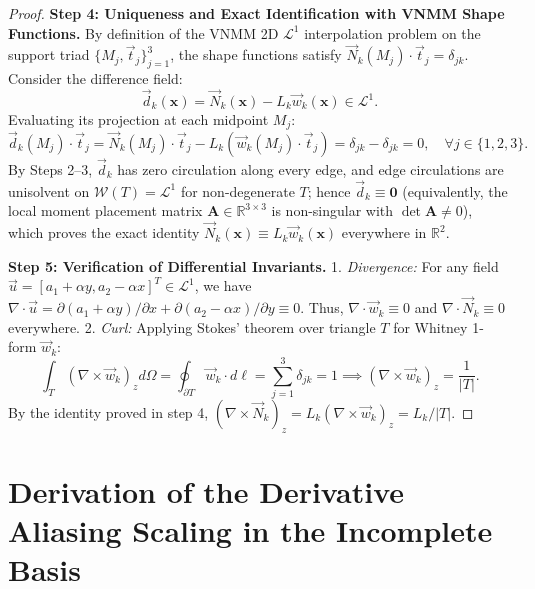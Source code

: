 \documentclass[preprint,12pt]{elsarticle}
\begin{document}
\begin{proof}
    \textbf{Step 4: Uniqueness and Exact Identification with VNMM Shape Functions.}
    By definition of the VNMM 2D $\mathcal{L}^1$ interpolation problem on the support triad $\{M_j, \vec{t}_j\}_{j=1}^3$, the shape functions satisfy $\vec{N}_k(M_j) \cdot \vec{t}_j = \delta_{jk}$. Consider the difference field:
    \begin{equation}
        \vec{d}_k(\mathbf{x}) = \vec{N}_k(\mathbf{x}) - L_k \vec{w}_k(\mathbf{x}) \in \mathcal{L}^1.
    \end{equation}
    Evaluating its projection at each midpoint $M_j$:
    \begin{equation}
        \vec{d}_k(M_j) \cdot \vec{t}_j = \vec{N}_k(M_j) \cdot \vec{t}_j - L_k \left( \vec{w}_k(M_j) \cdot \vec{t}_j \right) = \delta_{jk} - \delta_{jk} = 0, \quad \forall j \in \{1, 2, 3\}.
    \end{equation}
    By Steps 2--3, $\vec{d}_k$ has zero circulation along every edge, and edge circulations are unisolvent on $\mathcal{W}(T)=\mathcal{L}^1$ for non-degenerate $T$; hence $\vec{d}_k \equiv \mathbf{0}$ (equivalently, the local moment placement matrix $\mathbf{A} \in \mathbb{R}^{3 \times 3}$ is non-singular with $\det \mathbf{A} \neq 0$), which proves the exact identity $\vec{N}_k(\mathbf{x}) \equiv L_k \vec{w}_k(\mathbf{x})$ everywhere in $\mathbb{R}^2$.

    \textbf{Step 5: Verification of Differential Invariants.}
    1. \textit{Divergence:} For any field $\vec{u} = [a_1 + \alpha y, a_2 - \alpha x]^T \in \mathcal{L}^1$, we have $\nabla \cdot \vec{u} = \partial(a_1 + \alpha y)/\partial x + \partial(a_2 - \alpha x)/\partial y \equiv 0$. Thus, $\nabla \cdot \vec{w}_k \equiv 0$ and $\nabla \cdot \vec{N}_k \equiv 0$ everywhere.
    2. \textit{Curl:} Applying Stokes' theorem over triangle $T$ for Whitney 1-form $\vec{w}_k$:
    \begin{equation}
        \int_T (\nabla \times \vec{w}_k)_z d\Omega = \oint_{\partial T} \vec{w}_k \cdot d\boldsymbol{\ell} = \sum_{j=1}^3 \delta_{jk} = 1 \implies (\nabla \times \vec{w}_k)_z = \frac{1}{|T|}.
    \end{equation}
    By the identity proved in step 4, $(\nabla \times \vec{N}_k)_z = L_k (\nabla \times \vec{w}_k)_z = L_k / |T|$.
\end{proof}

\section{Derivation of the Derivative Aliasing Scaling in the Incomplete Basis}
\label{app:heuristic_aliasing_proof}
\end{document}
